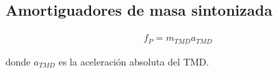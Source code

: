 


\subsection{Amortiguadores de masa sintonizada}

\begin{align}
    f_P = m_{TMD} a_{TMD}
\end{align}

donde $a_{TMD}$ es la aceleración absoluta del TMD.





